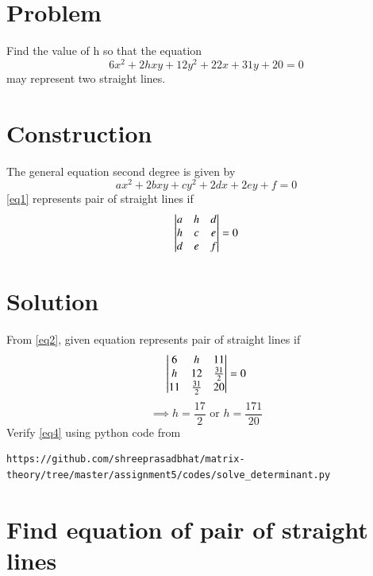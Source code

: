\documentclass[journal,12pt,twocolumn]{IEEEtran}
\begin{document}
\section{Problem}
Find the value of h so that the equation
\begin{equation}\nonumber
	6x^2 + 2hxy + 12y^2 + 22x + 31y + 20 = 0
\end{equation}
may represent two straight lines.
\section{Construction}
The general equation second degree is given by
\begin{equation}\label{eq1}
	ax^2 + 2bxy + cy^2 + 2dx + 2ey + f = 0
\end{equation}
\eqref{eq1} represents pair of straight lines if
\begin{equation}\label{eq2}
	\begin{vmatrix} a & h & d\\
			h & c & e\\
			d & e & f\end{vmatrix} = 0
\end{equation}
\section{Solution}
From \eqref{eq2}, given equation represents pair of straight lines if 
\begin{equation}\label{eq3}
	\begin{vmatrix} 6 & h & 11\\
			h & 12 & \frac{31}{2}\\
			11 & \frac{31}{2} & 20\end{vmatrix} = 0
\end{equation}
\begin{equation}\label{eq4}
	\implies h = \frac{17}{2} \text{ or } h = \frac{171}{20}
\end{equation}
Verify  \eqref{eq4} using python code from
\begin{lstlisting}
https://github.com/shreeprasadbhat/matrix-theory/tree/master/assignment5/codes/solve_determinant.py
\end{lstlisting}
\section{Find equation of pair of straight lines}
\end{document}
